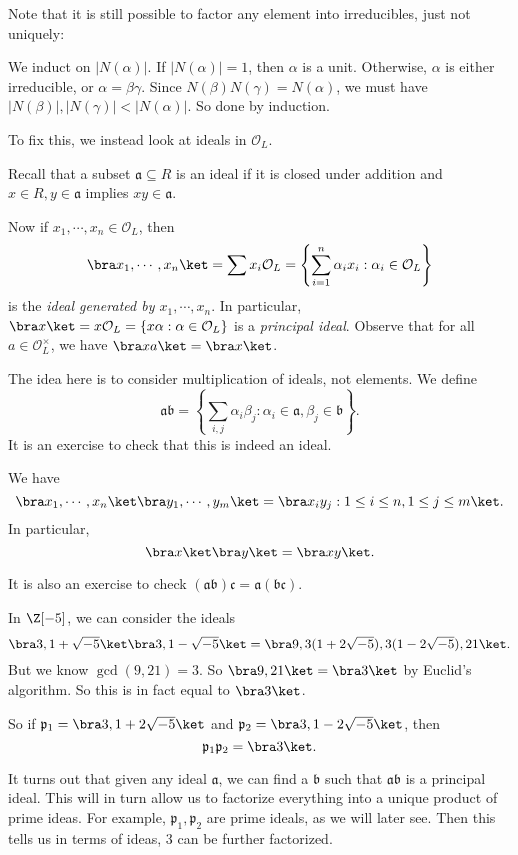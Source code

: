 \documentclass[a4paper]{article}
\begin{document}
Note that it is still possible to factor any element into irreducibles, just not uniquely:

We induct on $|N(\alpha)|$. If $|N(\alpha)| = 1$, then $\alpha$ is a unit. Otherwise, $\alpha$ is either irreducible, or $\alpha = \beta \gamma$. Since $N(\beta)N(\gamma) = N(\alpha)$, we must have $|N(\beta)|, |N(\gamma)| < |N(\alpha)|$. So done by induction.

To fix this, we instead look at ideals in $\mathcal{O}_L$.

Recall that a subset $\mathfrak{a} \subseteq R$ is an ideal if it is closed under addition and $x \in R, y \in \mathfrak{a}$ implies $xy \in \mathfrak{a}$.

Now if $x_1, \cdots, x_n \in \mathcal{O}_L$, then
\[
  \bra x_1, \cdots, x_n\ket = \sum x_i \mathcal{O}_L = \left\{\sum_{i = 1}^n \alpha_i x_i : \alpha_i \in \mathcal{O}_L\right\}
\]
is the \emph{ideal generated by $x_1, \cdots, x_n$}. In particular, $\bra x\ket = x \mathcal{O}_L = \{x\alpha: \alpha \in \mathcal{O}_L\}$ is a \emph{principal ideal}. Observe that for all $a \in \mathcal{O}_L^\times$, we have $\bra x a\ket = \bra x\ket$.

The idea here is to consider multiplication of ideals, not elements. We define
\[
  \mathfrak{a} \mathfrak{b} = \left\{\sum_{i, j} \alpha_i \beta_j: \alpha_i \in \mathfrak{a}, \beta_j \in \mathfrak{b}\right\}.
\]
It is an exercise to check that this is indeed an ideal.
\begin{eg}
  We have
  \[
    \bra x_1, \cdots, x_n\ket \bra y_1, \cdots, y_m\ket = \bra x_i y_j: 1 \leq i \leq n, 1 \leq j \leq m\ket.
  \]
  In particular,
  \[
    \bra x\ket \bra y\ket = \bra xy\ket.
  \]
\end{eg}
It is also an exercise to check $(\mathfrak{a}\mathfrak{b})\mathfrak{c} = \mathfrak{a}(\mathfrak{b}\mathfrak{c})$.

\begin{eg}
  In $\Z[-5]$, we can consider the ideals
  \[
    \bra 3, 1 + \sqrt{-5}\ket \bra 3, 1 - \sqrt{-5}\ket = \bra 9, 3(1 + 2\sqrt{-5}), 3(1 - 2\sqrt{-5}), 21\ket.
  \]
  But we know $\gcd(9, 21) = 3$. So $\bra 9, 21\ket = \bra 3\ket$ by Euclid's algorithm. So this is in fact equal to $\bra 3\ket$.

  So if $\mathfrak{p}_1 = \bra 3, 1 + 2\sqrt{-5}\ket$ and $\mathfrak{p}_2 = \bra 3, 1 - 2\sqrt{-5}\ket$, then
  \[
    \mathfrak{p}_1 \mathfrak{p}_2 = \bra 3\ket.
  \]
\end{eg}
It turns out that given any ideal $\mathfrak{a}$, we can find a $\mathfrak{b}$ such that $\mathfrak{a}\mathfrak{b}$ is a principal ideal. This will in turn allow us to factorize everything into a unique product of prime ideas. For example, $\mathfrak{p}_1, \mathfrak{p}_2$ are prime ideals, as we will later see. Then this tells us in terms of ideas, $3$ can be further factorized.
\end{document}

